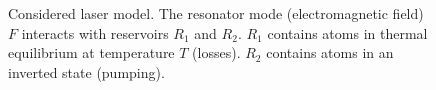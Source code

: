 \begin{figure}
\centering



\caption{Considered laser model. The resonator mode
  (electromagnetic field) $F$ interacts with reservoirs $R_1$ and
  $R_2$. $R_1$ contains atoms in thermal equilibrium at
  temperature $T$ (losses).  $R_2$ contains atoms in an inverted
state (pumping).}
\label{figPart2Ch1_1}
\end{figure}